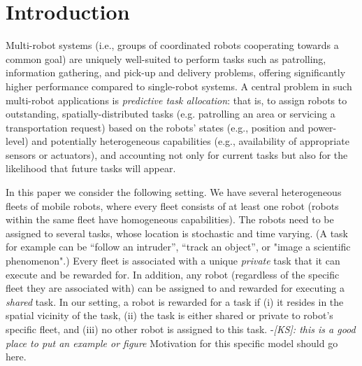 \documentclass[conference]{IEEEtran}
\newcommand{\ksline}[2]{{\color{blue}#1}{\em \color{blue}[KS]: #2}}
\newcommand{\todo}[1]{{\color{red}{\bf TODO:} #1}}
\newcommand{\ksline}[2]{#1}
\newcommand{\todo}[1]{}
\begin{document}
\section{Introduction}
Multi-robot systems (i.e., groups of coordinated robots cooperating towards a common goal) are uniquely well-suited to perform tasks such as patrolling, information gathering, and pick-up and delivery problems, offering significantly higher performance compared to single-robot systems. A central problem in such multi-robot applications is \emph{predictive task allocation}: that is, to assign robots to outstanding, spatially-distributed tasks (e.g. patrolling an area or servicing a transportation request) based on the robots' states (e.g., position and power-level) and potentially heterogeneous capabilities (e.g., availability of appropriate sensors or actuators), and accounting not only for current tasks but also for the likelihood that future tasks will appear.

In this paper we consider the following setting. We have several heterogeneous fleets of mobile robots, where every fleet consists of at least one robot (robots within the same fleet have homogeneous capabilities). The robots need to be assigned to several tasks, whose location is stochastic and time varying. (A task for example can be ``follow an intruder'', ``track an object'', or "image a scientific phenomenon".) Every fleet is associated with a unique \emph{private} task that it can execute and be rewarded for. In addition, any robot (regardless of the specific fleet they are associated with) can be assigned to and rewarded for executing a \emph{shared} task. In our setting, a robot is rewarded for a task if (i) it resides in the spatial vicinity of the task, (ii) the task is either shared or private to robot's specific fleet, and (iii) no other robot is assigned to this task. \ksline{-}{this is a good place to put an example or figure} 
\todo{Motivation for this specific model should go here.}
\end{document}
